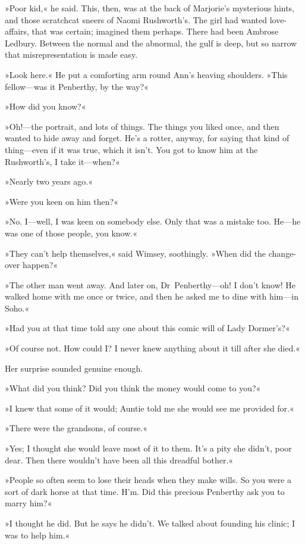 »Poor kid,« he said. This, then, was at the back of Marjorie's mysterious hints, and those scratchcat sneers of Naomi Rushworth's. The girl had wanted love-affairs, that was certain; imagined them perhaps. There had been Ambrose Ledbury. Between the normal and the abnormal, the gulf is deep, but so narrow that misrepresentation is made easy.

»Look here.« He put a comforting arm round Ann's heaving shoulders. »This fellow—was it Penberthy, by the way?«

»How did you know?«

»Oh!—the portrait, and lots of things. The things you liked once, and then wanted to hide away and forget. He's a rotter, anyway, for saying that kind of thing—even if it was true, which it isn't. You got to know him at the Rushworth's, I take it—when?«

»Nearly two years ago.«

»Were you keen on him then?«

»No. I—well, I was keen on somebody else. Only that was a mistake too. He—he was one of those people, you know.«

»They can't help themselves,« said Wimsey, soothingly. »When did the change-over happen?«

»The other man went away. And later on, Dr~Penberthy—oh! I don't know! He walked home with me once or twice, and then he asked me to dine with him—in Soho.«

»Had you at that time told any one about this comic will of Lady Dormer's?«

»Of course not. How could I? I never knew anything about it till after she died.«

Her surprise sounded genuine enough.

»What did you think? Did you think the money would come to you?«

»I knew that some of it would; Auntie told me she would see me provided for.«

»There were the grandsons, of course.«

»Yes; I thought she would leave most of it to them. It's a pity she didn't, poor dear. Then there wouldn't have been all this dreadful bother.«

»People so often seem to lose their heads when they make wills. So you were a sort of dark horse at that time. H'm. Did this precious Penberthy ask you to marry him?«

»I thought he did. But he says he didn't. We talked about founding his clinic; I was to help him.«

